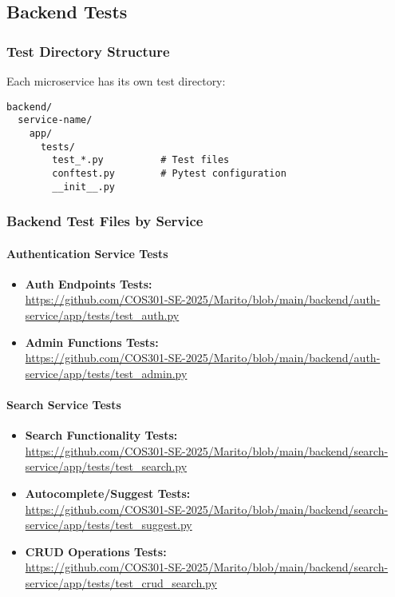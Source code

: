 \documentclass[12pt,a4paper]{article}
\begin{document}
\subsection{Backend Tests}

\subsubsection{Test Directory Structure}
Each microservice has its own test directory:

\begin{lstlisting}
backend/
  service-name/
    app/
      tests/
        test_*.py          # Test files
        conftest.py        # Pytest configuration
        __init__.py
\end{lstlisting}

\subsubsection{Backend Test Files by Service}

\paragraph{Authentication Service Tests}
\begin{itemize}
    \item \textbf{Auth Endpoints Tests:} \\
    \url{https://github.com/COS301-SE-2025/Marito/blob/main/backend/auth-service/app/tests/test_auth.py}
    
    \item \textbf{Admin Functions Tests:} \\
    \url{https://github.com/COS301-SE-2025/Marito/blob/main/backend/auth-service/app/tests/test_admin.py}
\end{itemize}

\paragraph{Search Service Tests}
\begin{itemize}
    \item \textbf{Search Functionality Tests:} \\
    \url{https://github.com/COS301-SE-2025/Marito/blob/main/backend/search-service/app/tests/test_search.py}
    
    \item \textbf{Autocomplete/Suggest Tests:} \\
    \url{https://github.com/COS301-SE-2025/Marito/blob/main/backend/search-service/app/tests/test_suggest.py}
    
    \item \textbf{CRUD Operations Tests:} \\
    \url{https://github.com/COS301-SE-2025/Marito/blob/main/backend/search-service/app/tests/test_crud_search.py}
\end{itemize}
\end{document}
